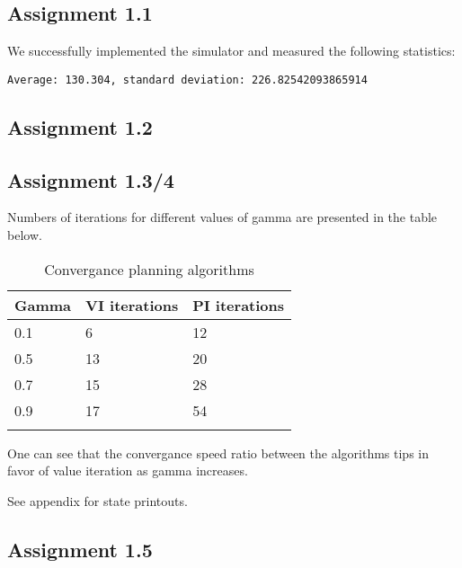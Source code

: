 \documentclass{article}
\begin{document}
\subsection{Assignment 1.1}
We successfully implemented the simulator and measured the following statistics: 

\begin{verbatim}
Average: 130.304, standard deviation: 226.82542093865914
\end{verbatim}
\subsection{Assignment 1.2}


\subsection{Assignment 1.3/4} 

Numbers of iterations for different values of gamma are presented in the table below. 

\begin{longtable}
{| p{}| p{} | p{} |} 
   Gamma & VI iterations & PI iterations \\
    \hline
0.1 & 6 & 12 \\ 
0.5 & 13& 20 \\
0.7 & 15& 28\\
0.9 &17 &  54\\
\caption{Convergance planning algorithms} 
\label{tab:myfirstlongtable}
\end{longtable}

One can see that the convergance speed ratio between the algorithms tips in favor of value iteration as gamma increases.

See appendix for state printouts.

\subsection{Assignment 1.5}



\begin{appendices}
	
\end{appendices}
\end{document}
